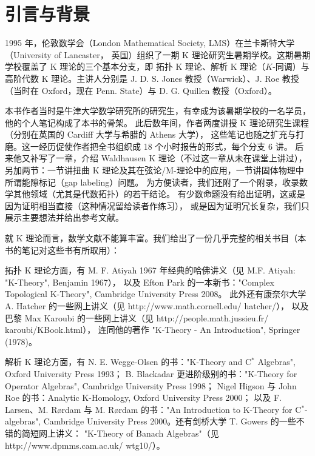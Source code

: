 \section*{引言与背景}

1995 年，伦敦数学会（London Mathematical Society, LMS）在兰卡斯特大学（University of Lancaster，
英国）组织了一期 K 理论研究生暑期学校。这期暑期学校覆盖了 K 理论的三个基本分支，即
拓扑 K 理论、解析 K 理论（$K$-同调）与高阶代数 K 理论。主讲人分别是
J. D. S. Jones 教授（Warwick）、J. Roe 教授（当时在 Oxford，现在 Penn. State）与
D. G. Quillen 教授（Oxford）。

本书作者当时是牛津大学数学研究所的研究生，有幸成为该暑期学校的一名学员，他的个人笔记构成了本书的骨架。
此后数年间，作者两度讲授 K 理论研究生课程（分别在英国的 Cardiff 大学与希腊的 Athens 大学），
这些笔记也随之扩充与打磨。这一经历促使作者把全书组织成 18 个小时报告的形式，每个分支 6 讲。
后来他又补写了一章，介绍 Waldhausen K 理论（不过这一章从未在课堂上讲过），
另加两节：一节讲扭曲 K 理论及其在弦论/M-理论中的应用，一节讲固体物理中所谓能隙标记（gap labeling）问题。
为方便读者，我们还附了一个附录，收录数学其他领域（尤其是代数拓扑）的若干结论。
有少数命题没有给出证明，这或是因为证明相当直接（这种情况留给读者作练习），
或是因为证明冗长复杂，我们只展示主要想法并给出参考文献。

就 K 理论而言，数学文献不能算丰富。我们给出了一份几乎完整的相关书目（本书的笔记对这些书有所取用）：

拓扑 K 理论方面，有 M. F. Atiyah 1967 年经典的哈佛讲义（见 M.F. Atiyah: "K-Theory", Benjamin 1967），
以及 Efton Park 的一本新书："Complex Topological K-Theory", Cambridge University Press 2008。
此外还有康奈尔大学 A. Hatcher 的一些网上讲义（见 http://www.math.cornell.edu/ hatcher/），
以及巴黎 Max Karoubi 的一些网上讲义（见 http://people.math.jussieu.fr/ karoubi/KBook.html），
连同他的著作 "K-Theory - An Introduction", Springer (1978)。

解析 K 理论方面，有 N. E. Wegge-Olsen 的书："K-Theory and C$^*$ Algebras", Oxford University Press 1993；
B. Blackadar 更进阶级别的书："K-Theory for Operator Algebras", Cambridge University Press 1998；
Nigel Higson 与 John Roe 的书：Analytic K-Homology, Oxford University Press 2000；
以及 F. Larsen、M. Rørdam 与 M. Rørdam 的书："An Introduction to K-Theory for C$^*$-algebras",
Cambridge University Press 2000。还有剑桥大学 T. Gowers 的一些不错的简短网上讲义：
"K-Theory of Banach Algebras"（见 http://www.dpmms.cam.ac.uk/ wtg10/）。

